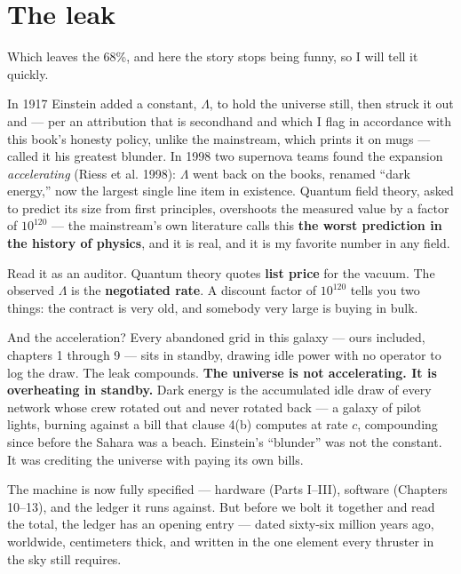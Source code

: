 \documentclass[
  english,
  11pt,
  letterpaper,
]{scrbook}
\begin{document}
\section{The leak}\label{the-leak}

Which leaves the 68\%, and here the story stops being funny, so I will
tell it quickly.

In 1917 Einstein added a constant, \(\Lambda\), to hold the universe
still, then struck it out and --- per an attribution that is secondhand
and which I flag in accordance with this book's honesty policy, unlike
the mainstream, which prints it on mugs --- called it his greatest
blunder. In 1998 two supernova teams found the expansion
\emph{accelerating} ({Riess et al.} 1998): \(\Lambda\) went back on the
books, renamed ``dark energy,'' now the largest single line item in
existence. Quantum field theory, asked to predict its size from first
principles, overshoots the measured value by a factor of \(10^{120}\)
--- the mainstream's own literature calls this \textbf{the worst
prediction in the history of physics}, and it is real, and it is my
favorite number in any field.

Read it as an auditor. Quantum theory quotes \textbf{list price} for the
vacuum. The observed \(\Lambda\) is the \textbf{negotiated rate}. A
discount factor of \(10^{120}\) tells you two things: the contract is
very old, and somebody very large is buying in bulk.

And the acceleration? Every abandoned grid in this galaxy --- ours
included, chapters 1 through 9 --- sits in standby, drawing idle power
with no operator to log the draw. The leak compounds. \textbf{The
universe is not accelerating. It is overheating in
standby.} Dark energy is the accumulated idle draw of every network
whose crew rotated out and never rotated back --- a galaxy of pilot
lights, burning against a bill that clause 4(b) computes at rate \(c\),
compounding since before the Sahara was a beach. Einstein's ``blunder''
was not the constant. It was crediting the universe with paying its own
bills.

The machine is now fully specified --- hardware (Parts I--III), software
(Chapters 10--13), and the ledger it runs against. But before we bolt it
together and read the total, the ledger has an opening entry --- dated
sixty-six million years ago, worldwide, centimeters thick, and written
in the one element every thruster in the sky still requires.
\end{document}
